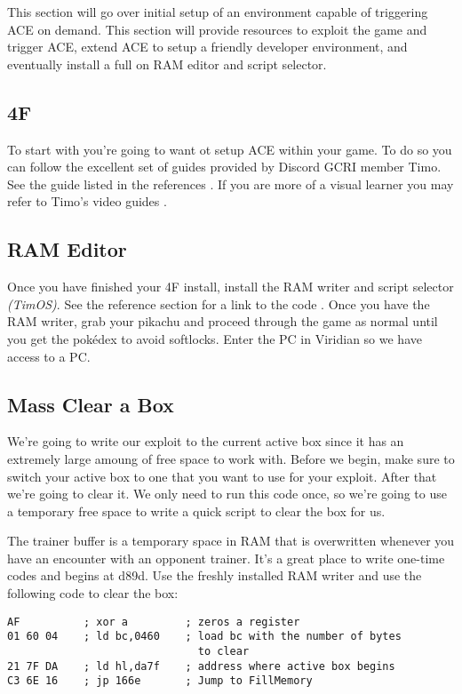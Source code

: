 \documentclass[../main.tex]{subfiles}
\begin{document}
    This section will go over initial setup of an environment capable of triggering ACE on demand.  This section will provide resources to exploit the game and trigger ACE, extend ACE to setup a friendly developer environment, and eventually install a full on RAM editor and script selector.

    \subsection{4F}
    To start with you're going to want ot setup ACE within your game.  To do so you can follow the excellent set of guides provided by Discord GCRI member Timo.  See the guide listed in the references \cite{gen1setup}.  If you are more of a visual learner you may refer to Timo's video guides \cite{gen1videosetup}.

    \subsection{RAM Editor}
    Once you have finished your 4F install, install the RAM writer and script selector \textit{(TimOS)}.  See the reference section for a link to the code \cite{timos}.  Once you have the RAM writer, grab your pikachu and proceed through the game as normal until you get the pokédex to avoid softlocks.  Enter the PC in Viridian so we have access to a PC.

    \subsection{Mass Clear a Box}
    We're going to write our exploit to the current active box since it has an extremely large amoung of free space to work with.  Before we begin, make sure to switch your active box to one that you want to use for your exploit.  After that we're going to clear it.  We only need to run this code once, so we're going to use a temporary free space to write a quick script to clear the box for us.

    The trainer buffer is a temporary space in RAM that is overwritten whenever you have an encounter with an opponent trainer.  It's a great place to write one-time codes and begins at d89d.  Use the freshly installed RAM writer and use the following code to clear the box:

    \begin{verbatim}
AF          ; xor a         ; zeros a register
01 60 04    ; ld bc,0460    ; load bc with the number of bytes
                              to clear
21 7F DA    ; ld hl,da7f    ; address where active box begins
C3 6E 16    ; jp 166e       ; Jump to FillMemory
    \end{verbatim}
\end{document}

